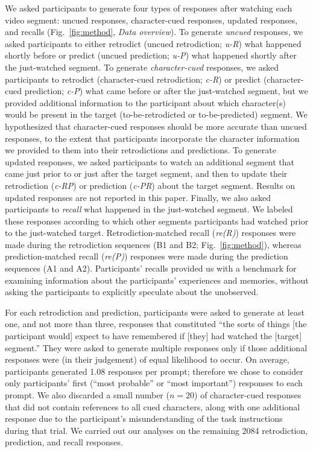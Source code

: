 \documentclass[10pt]{article}
\begin{document}
We asked participants to generate four types of responses after watching each video segment: uncued responses, character-cued responses, updated responses, and recalls (Fig.~\ref{fig:method}, \textit{Data overview}).  To generate \textit{uncued} responses, we asked participants to either retrodict (uncued retrodiction; \textit{u-R}) what happened shortly before or predict (uncued prediction; \textit{u-P}) what happened shortly after the just-watched segment.  To generate \textit{character-cued} responses, we asked participants to retrodict (character-cued retrodiction; \textit{c-R}) or predict (character-cued prediction; \textit{c-P}) what came before or after the just-watched segment, but we provided additional information to the participant about which character(s) would be present in the target (to-be-retrodicted or to-be-predicted) segment.  We hypothesized that character-cued responses should be more accurate than uncued responses, to the extent that participants incorporate the character information we provided to them into their retrodictions and predictions.  To generate updated responses, we asked participants to watch an additional segment that came just prior to or just after the target segment, and then to update their retrodiction (\textit{c-RP}) or prediction (\textit{c-PR}) about the target segment. Results on updated responses are not reported in this paper. Finally, we also asked participants to \textit{recall} what happened in the just-watched segment.  We labeled these responses according to which other segments participants had watched prior to the just-watched target.  Retrodiction-matched recall (\textit{re(R)}) responses were made during the retrodiction sequences (B1 and B2; Fig.~\ref{fig:method}), whereas prediction-matched recall (\textit{re(P)}) responses were made during the prediction sequences (A1 and A2).  Participants' recalls provided us with a benchmark for examining information about the participants' experiences and memories, without asking the participants to explicitly speculate about the unobserved.



For each retrodiction and prediction, participants were asked to generate at least one, and not more than three, responses that constituted ``the sorts of things [the participant would] expect to have remembered if [they] had watched the [target] segment.''  They were asked to generate multiple responses only if those additional responses were (in their judgement) of equal likelihood to occur.  On average, participants generated 1.08 responses per prompt; therefore we chose to consider only participants' first (``most probable'' or ``most important'') responses to each prompt.  We also discarded a small number ($n = 20$) of character-cued responses that did not contain references to all cued characters, along with one additional response due to the participant's misunderstanding of the task instructions during that trial.  We carried out our analyses on the remaining 2084 retrodiction, prediction, and recall responses.
\end{document}
